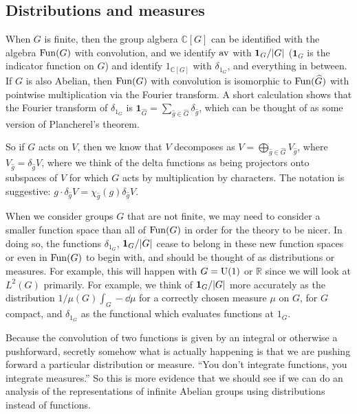 \documentclass[../../rtnotes.tex]{subfiles}
\begin{document}
\subsection{Distributions and measures}
When $G$ is finite, then the group algbera $\mathbb C[G]$ can be identified with the algebra $\operatorname{Fun}(G)$ with convolution, and we identify $\mathrm{av}$ with $\mathbf{1}_G/\abs{G}$ ($\mathbf{1}_G$ is the indicator function on $G$) and identify $1_{\mathbb C[G]}$ with $\delta_{1_{G}}$, and everything in between. If $G$ is also Abelian, then $\operatorname{Fun}(G)$ with convolution is isomorphic to $\operatorname{Fun}(\widehat G)$ with pointwise multiplication via the Fourier transform. A short calculation shows that the Fourier transform of $\delta_{1_G}$ is $\mathbf{1}_{\widehat G} = \sum_{\hat g\in\widehat G}\delta_{\hat g}$, which can be thought of as some version of Plancherel's theorem.

So if $G$ acts on $V$, then we know that $V$ decomposes as $V = \bigoplus_{\hat g\in \widehat G}V_{\hat g}$, where $V_{\hat g} = \delta_{\hat g}V$, where we think of the delta functions as being projectors onto subspaces of $V$ for which $G$ acts by multiplication by characters. The notation is suggestive: $g\cdot \delta_{\hat g}V = \chi_{\hat g}(g)\delta_{\hat g}V$.

When we consider groups $G$ that are not finite, we may need to consider a smaller function space than all of $\operatorname{Fun}(G)$ in order for the theory to be nicer. In doing so, the functions $\delta_{1_G}$, $\mathbf{1}_G/\abs{G}$ cease to belong in these new function spaces or even in $\operatorname{Fun}(G)$ to begin with, and should be thought of as distributions or measures. For example, this will happen with $G = \operatorname{U}(1)$ or $\mathbb R$ since we will look at $L^2(G)$ primarily. For example, we think of $\mathbf{1}_G/\abs{G}$ more accurately as the distribution $1/\mu(G)\int_G-\dd\mu$ for a correctly chosen measure $\mu$ on $G$, for $G$ compact, and $\delta_{1_G}$ as the functional which evaluates functions at $1_G$.

Because the convolution of two functions is given by an integral or otherwise a pushforward, secretly somehow what is actually happening is that we are pushing forward a particular distribution or measure. ``You don't integrate functions, you integrate measures.'' So this is more evidence that we should see if we can do an analysis of the representations of infinite Abelian groups using distributions instead of functions.

\end{document}
